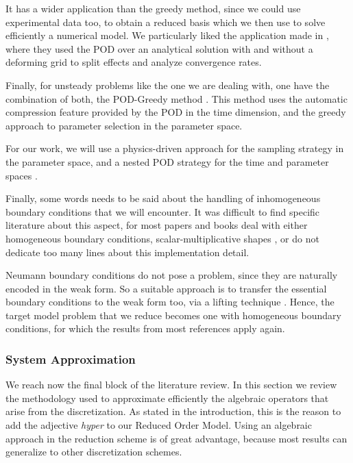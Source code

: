 \documentclass[thesis.tex]{subfiles}
\begin{document}
It has a wider application than the greedy method,
since we could use experimental data too, 
to obtain a reduced basis which we then use to solve efficiently a numerical model.
We particularly liked the application made in
\cite{2003_podBasedReducedOrderModelsWithDeformingGrids_anttonen},
where they used the POD over an analytical solution 
with and without a deforming grid to split effects and analyze convergence rates.

Finally, for unsteady problems like the one we are dealing with,
one have the combination of both, the \mbox{POD-Greedy} method
\cite{Haasdonk2008, 
Haasdonk2013}.
This method uses the automatic compression feature provided by the POD in the time dimension,
and the greedy approach to parameter selection in the parameter space.

For our work, we will use a physics-driven approach for the sampling strategy in the parameter space,
and a nested POD strategy for the time and parameter spaces \cite{Santo_Manzoni_2019}.

Finally, some words needs to be said about the handling of inhomogeneous boundary conditions
that we will encounter.
It was difficult to find specific literature about this aspect,
for most papers and books deal with either homogeneous boundary conditions, 
scalar-multiplicative shapes 
\cite{separableBoundaryCondition,
separableBoundaryCondition_Two},
or do not dedicate too many lines about this implementation detail.

Neumann boundary conditions do not pose a problem, 
since they are naturally encoded in the weak form.
So a suitable approach is to transfer the essential boundary conditions to the weak form too,
via a lifting technique
\cite{2007_ReducedOrderModelingTimeDependentPDEsMultipleParametersBoundaryData_gunzburger}.
Hence, the target model problem that we reduce 
becomes one with homogeneous boundary conditions,
for which the results from most references apply again.

\subsubsection{System Approximation}
We reach now the final block of the literature review.
In this section we review the methodology used to approximate efficiently 
the algebraic operators that arise from the discretization.
As stated in the introduction, this is the reason to add the adjective \textit{hyper} 
to our Reduced Order Model.
Using an algebraic approach in the reduction scheme is of great advantage,
because most results can generalize to other discretization schemes.
\end{document}
